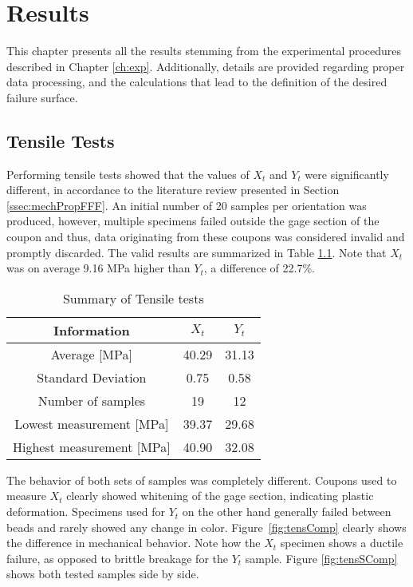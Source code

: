 \documentclass[main.tex]{subfiles}
\begin{document}
\chapter{Results} \label{ch:res}

This chapter presents all the results stemming from the experimental procedures described in Chapter \ref{ch:exp}. Additionally, details are provided regarding proper data processing, and the calculations that lead to the definition of the desired failure surface. 

\section{Tensile Tests} \label{sec:tensr}
Performing tensile tests showed that the values of $X_t$ and $Y_t$ were significantly different, in accordance to the literature review presented in Section \ref{ssec:mechPropFFF}. An initial number of 20 samples per orientation was produced, however, multiple specimens failed outside the gage section of the coupon and thus, data originating from these coupons was considered invalid and promptly discarded. The valid results are summarized in Table \ref{tab:tensrtab}. Note that $X_t$ was on average 9.16 MPa higher than $Y_t$, a difference of 22.7\%.
\begin{table} [h]
	\centering
	\caption{Summary of Tensile tests}
\begin{tabular}{ c| c c } 
	\toprule
	\textbf{Information} & $X_t$ & $Y_t$\\
	\midrule
	Average [MPa] & 40.29 & 31.13\\
	Standard Deviation & 0.75 & 0.58\\
	Number of samples & 19 & 12\\
	Lowest measurement [MPa] &39.37  & 29.68\\
	Highest measurement [MPa] &40.90 & 32.08\\
	\bottomrule
\end{tabular}
\label{tab:tensrtab}
\end{table}

The behavior of both sets of samples was completely different. Coupons used to measure $X_t$ clearly showed whitening of the gage section, indicating plastic deformation. Specimens used for $Y_t$ on the other hand generally failed between beads and rarely showed any change in color. Figure~\ref{fig:tensComp} clearly shows the difference in mechanical behavior. Note how the $X_t$ specimen shows a ductile failure, as opposed to brittle breakage for the $Y_t$ sample. Figure \ref{fig:tensSComp} shows both tested samples side by side.
\pagebreak
\end{document}
